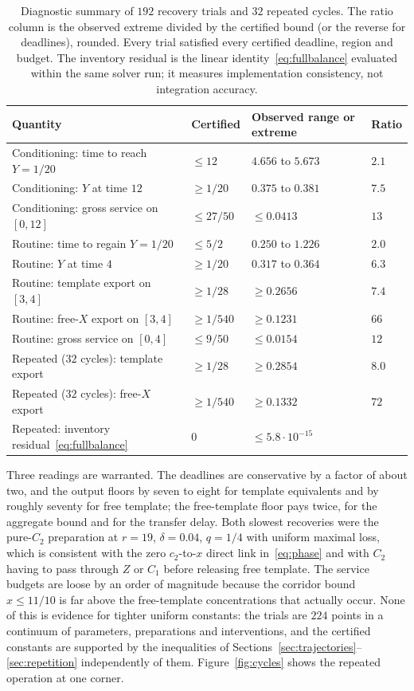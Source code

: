 \documentclass[11pt,a4paper]{article}
\theoremstyle{plain}
\theoremstyle{definition}
\theoremstyle{remark}
\begin{document}
\begin{table}[tb]
\centering\small
\begin{tabular}{llll}
\toprule
Quantity & Certified & Observed range or extreme & Ratio\\
\midrule
Conditioning: time to reach $Y=1/20$ & $\le12$ & $4.656$ to $5.673$ & $2.1$\\
Conditioning: $Y$ at time $12$ & $\ge1/20$ & $0.375$ to $0.381$ & $7.5$\\
Conditioning: gross service on $[0,12]$ & $\le27/50$ & $\le0.0413$ & $13$\\
Routine: time to regain $Y=1/20$ & $\le5/2$ & $0.250$ to $1.226$ & $2.0$\\
Routine: $Y$ at time $4$ & $\ge1/20$ & $0.317$ to $0.364$ & $6.3$\\
Routine: template export on $[3,4]$ & $\ge1/28$ & $\ge0.2656$ & $7.4$\\
Routine: free-$X$ export on $[3,4]$ & $\ge1/540$ & $\ge0.1231$ & $66$\\
Routine: gross service on $[0,4]$ & $\le9/50$ & $\le0.0154$ & $12$\\
Repeated ($32$ cycles): template export & $\ge1/28$ & $\ge0.2854$ & $8.0$\\
Repeated ($32$ cycles): free-$X$ export & $\ge1/540$ & $\ge0.1332$ & $72$\\
Repeated: inventory residual~\eqref{eq:fullbalance} & $0$ & $\le5.8\cdot10^{-15}$ & \\
\bottomrule
\end{tabular}
\caption{Diagnostic summary of $192$ recovery trials and $32$ repeated cycles. The ratio column is the observed extreme divided by the certified bound (or the reverse for deadlines), rounded. Every trial satisfied every certified deadline, region and budget. The inventory residual is the linear identity~\eqref{eq:fullbalance} evaluated within the same solver run; it measures implementation consistency, not integration accuracy.}
\label{tab:diag}
\end{table}

Three readings are warranted. The deadlines are conservative by a factor of about two, and the output floors by seven to eight for template equivalents and by roughly seventy for free template; the free-template floor pays twice, for the aggregate bound and for the transfer delay. Both slowest recoveries were the pure-$C_2$ preparation at $r=19$, $\delta=0.04$, $q=1/4$ with uniform maximal loss, which is consistent with the zero $c_2$-to-$x$ direct link in~\eqref{eq:phase} and with $C_2$ having to pass through $Z$ or $C_1$ before releasing free template. The service budgets are loose by an order of magnitude because the corridor bound $x\le11/10$ is far above the free-template concentrations that actually occur. None of this is evidence for tighter uniform constants: the trials are $224$ points in a continuum of parameters, preparations and interventions, and the certified constants are supported by the inequalities of Sections~\ref{sec:trajectories}--\ref{sec:repetition} independently of them. Figure~\ref{fig:cycles} shows the repeated operation at one corner.
\end{document}
